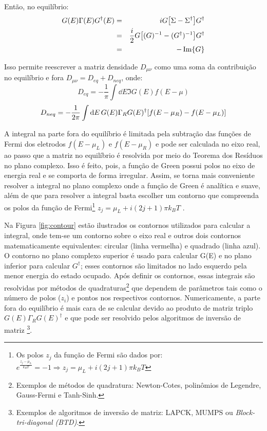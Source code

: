 Então, no equilíbrio:
\begin{eqnarray}
	G(E)\Gamma(E)G^{\dagger}(E)&=&i G\bqty{\Sigma-\Sigma^{\dagger}}G^{\dagger}\nonumber \\
	&=&\frac{i}{2}G\bqty{(G)^{-1}-(G^{\dagger})^{-1}}G^{\dagger}\nonumber\\
	&=&-\Im{G}
\end{eqnarray}

Isso permite reescrever a matriz densidade $ D_{\mu\nu} $ como uma soma da contribuição no equilíbrio e fora $ D_{\mu\nu}=D_{eq}+D_{neq} $, onde:
\begin{equation}\label{eq:eq}
	D_{eq}=-\frac{1}{\pi}\int\dd{E}\Im{G(E)}f(E-\mu)
\end{equation}
\begin{equation}\label{eq:neq}
	D_{neq}=-\frac{1}{2\pi}\int\dd{E} G(E)\Gamma_R G(E)^{\dagger}\bqty{f(E-\mu_R)-f(E-\mu_L)}
\end{equation}

A integral na parte fora do equilíbrio é limitada pela subtração das funções de Fermi dos eletrodos $ f(E-\mu_L) $ e $ f(E-\mu_R) $ e pode ser calculada no eixo real, ao passo que a matriz no equilíbrio é resolvida por meio do Teorema dos Resíduos no plano complexo. Isso é feito, pois, a função de Green possui polos no eixo de energia real e se comporta de forma irregular. Assim, se torna mais conveniente resolver a integral no plano complexo onde a função de Green é analítica e suave, além de que para resolver a integral basta escolher um contorno que compreenda os polos da função de Fermi\footnote{Os polos $z_j$ da função de Fermi são dados por: $ e^{\frac{z_j-\mu_L}{k_BT}} =-1\Rightarrow z_j=\mu_L+i(2j+1)\pi k_BT$} $z_j=\mu_L+i(2j+1)\pi k_BT$ \cite{tese-pedro}.

Na Figura \ref{fig:contour} estão ilustrados os contornos utilizados para calcular a integral, onde tem-se um contorno sobre o eixo real e outros dois contornos matematicamente equivalentes: circular (linha vermelha) e quadrado (linha azul). O contorno no plano complexo superior é usado para calcular G(E) e no plano inferior para calcular $ G^{\dagger} $; esses contornos são limitados no lado esquerdo pela menor energia do estado ocupado. Após definir os contornos, essas integrais são resolvidas por métodos de quadraturas\footnote{Exemplos de métodos de quadratura: Newton-Cotes, polinômios de Legendre, Gauss-Fermi e Tanh-Sinh.} que dependem de parâmetros tais como o número de polos ($ z_i $) e pontos nos respectivos contornos. Numericamente, a parte fora do equilíbrio é mais cara de se calcular devido ao produto de matriz triplo $ G(E)\Gamma_R G(E)^{\dagger} $ e que pode ser resolvido pelos algoritmos de inversão de matriz \footnote{Exemplos de algoritmos de inversão de matriz: LAPCK, MUMPS ou \textit{Block-tri-diagonal (BTD)}.}. \cite{transiesta2} 

